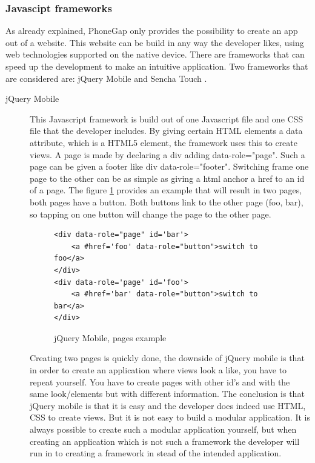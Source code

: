 \subsubsection*{Javascipt frameworks}
As already explained, PhoneGap only provides the possibility to create an app out of a website. This website can be build in any way the developer likes, using web technologies supported on the native device. There are frameworks that can speed up the development to make an intuitive application. Two frameworks that are considered are: jQuery Mobile \cite{jQuery-Mobile} and  Sencha Touch \cite{sencha}. 
\begin{description}
\item [jQuery Mobile]
This Javascript framework is build out of one Javascript file and one CSS file that the developer includes. By giving certain HTML elements a data attribute, which is a HTML5 element, the framework uses this to create views. A page is made by declaring a div adding data-role="page". Such a page can be given a footer like div data-role="footer". 
Switching frame one page to the other can be as simple as giving a html anchor a href to an id of a page. The figure \ref{fig:jquery} provides an example that will result in two pages, both pages have a button. Both buttons link to the other page (foo, bar), so tapping on one button will change the page to the other page.
\begin{figure}[H]
\begin{lstlisting}
<div data-role="page" id='bar'>
	<a #href='foo' data-role="button">switch to foo</a>
</div>
<div data-role='page' id='foo'>
	<a #href='bar' data-role="button">switch to bar</a>
</div>
\end{lstlisting}
\caption{jQuery Mobile, pages example}
\label{fig:jquery}
\end{figure}

Creating two pages is quickly done, the downside of jQuery mobile is that in order to create an application where views look a like, you have to repeat yourself. You have to create pages with other id's and with the same look/elements but with different information. The conclusion is that jQuery mobile is that it is easy and the developer does indeed use HTML, CSS to create views.  But it is not easy to build a modular application. It is always possible to create such a modular application yourself, but when creating an application which is not such a framework the developer will run in to creating a framework in stead of the intended application.


\end{description}

